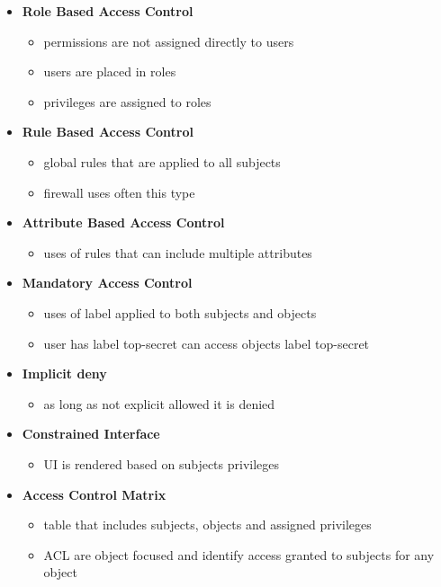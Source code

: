 \documentclass[11pt,twoside,landscape]{article}
\begin{document}
\begin{multicols}{4}
\begin{itemize}
\begin{itemize}
\item \textbf{Role Based Access Control}
\begin{itemize}
\item permissions are not assigned directly to users
\item users are placed in roles
\item privileges are assigned to roles
\end{itemize}

\item \textbf{Rule Based Access Control}
\begin{itemize}
\item global rules that are applied to all subjects
\item firewall uses often this type
\end{itemize}

\item \textbf{Attribute Based Access Control}
\begin{itemize}
\item uses of rules that can include multiple attributes
\end{itemize}

\item \textbf{Mandatory Access Control}
\begin{itemize}
\item uses of label applied to both subjects and objects
\item user has label top-secret can access objects label top-secret
\end{itemize}

\item \textbf{Implicit deny}
\begin{itemize}
\item as long as not explicit allowed it is denied
\end{itemize}

\item \textbf{Constrained Interface}
\begin{itemize}
\item UI is rendered based on subjects privileges
\end{itemize}

\item \textbf{Access Control Matrix}
\begin{itemize}
\item table that includes subjects, objects and assigned privileges
\item ACL are object focused and identify access granted to subjects for any object
\end{itemize}


\end{itemize}
\end{itemize}
\end{multicols}
\end{document}
